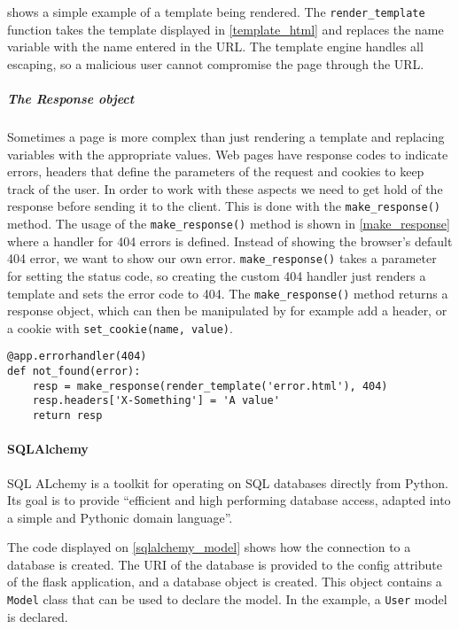  shows a simple example of a template being rendered.
The \texttt{render\_template} function takes the template displayed in \cref{template_html} and replaces the name variable with the name entered in the URL.
The template engine handles all escaping, so a malicious user cannot compromise the page through the URL.

\subparagraph{The Response object}
Sometimes a page is more complex than just rendering a template and replacing variables with the appropriate values.
Web pages have response codes to indicate errors, headers that define the parameters of the request and cookies to keep track of the user.
In order to work with these aspects we need to get hold of the response before sending it to the client.
This is done with the \texttt{make\_response()} method.
The usage of the \texttt{make\_response()} method is shown in \cref{make_response} where a handler for 404 errors is defined.
Instead of showing the browser's default 404 error, we want to show our own error.
\texttt{make\_response()} takes a parameter for setting the status code, so creating the custom 404 handler just renders a template and sets the error code to 404.
The \texttt{make\_response()} method returns a response object, which can then be manipulated by for example add a header, or a cookie with \texttt{set\_cookie(name, value)}.

\begin{lstlisting}[style=python, caption='Using make\_response to create a custom 404 handler', label=make_response]
@app.errorhandler(404)
def not_found(error):
    resp = make_response(render_template('error.html'), 404)
    resp.headers['X-Something'] = 'A value'
    return resp
\end{lstlisting}

\paragraph{SQLAlchemy}
SQL ALchemy is a toolkit for operating on SQL databases directly from Python.
Its goal is to provide ``efficient and high performing database access, adapted into a simple and Pythonic domain language''\citep{sqlalchemy_official}.

The code displayed on \cref{sqlalchemy_model} shows how the connection to a database is created.
The URI of the database is provided to the config attribute of the flask application, and a database object is created.
This object contains a \texttt{Model} class that can be used to declare the model.
In the example, a \texttt{User} model is declared.

